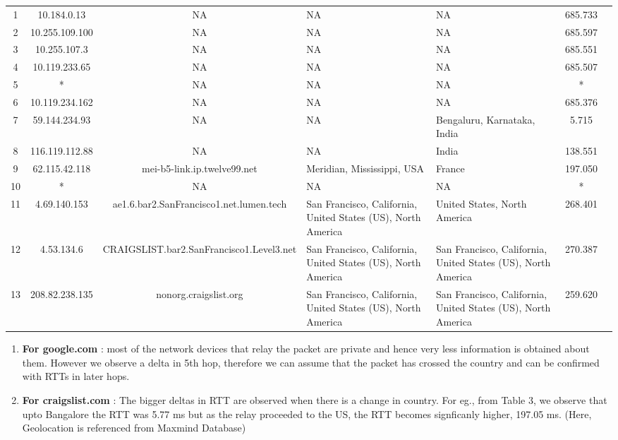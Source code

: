 \documentclass[12pt]{article}
\begin{document}
\begin{enumerate}
\begin{table}[h!]
{\begin{tabular}{|c|c|c| >{\centering\arraybackslash}m{} | >{\centering\arraybackslash}m{} |c|c|}
            \hline
            1 & 10.184.0.13 & NA & NA & NA & 685.733 \\
            2 & 10.255.109.100 & NA & NA & NA & 685.597 \\
            3 & 10.255.107.3 & NA & NA & NA & 685.551 \\
            4 & 10.119.233.65 & NA & NA & NA & 685.507 \\
            5 & * & NA & NA & NA & * \\
            6 & 10.119.234.162 & NA & NA & NA & 685.376 \\
            7 & 59.144.234.93 & NA & NA & Bengaluru, Karnataka, India & 5.715 \\
            8 & 116.119.112.88 & NA & NA & India & 138.551 \\
            9 & 62.115.42.118 & mei-b5-link.ip.twelve99.net & Meridian, Mississippi, USA & France & 197.050 \\
            10 & * & NA & NA & NA & * \\
            11 & 4.69.140.153 & ae1.6.bar2.SanFrancisco1.net.lumen.tech & San Francisco, California, United States (US), North America & United States, North America & 268.401 \\
            12 & 4.53.134.6 & CRAIGSLIST.bar2.SanFrancisco1.Level3.net & San Francisco, California, United States (US), North America & San Francisco, California, United States (US), North America & 270.387 \\
            13 & 208.82.238.135 & nonorg.craigslist.org & San Francisco, California, United States (US), North America & San Francisco, California, United States (US), North America & 259.620 \\
            \hline
        \end{tabular}}
    \end{table}

    \begin{enumerate}
        \item \textbf{For google.com} : most of the network devices that relay the packet are private and hence very less information is obtained about them. However we observe a delta in 5th hop, therefore we can assume that the packet has crossed the country and can be confirmed with RTTs in later hops.
        \item \textbf{For craigslist.com} : The bigger deltas in RTT are observed when there is a change in country. For eg., from Table 3, we observe that upto Bangalore the RTT was 5.77 ms but as the relay proceeded to the US, the RTT becomes signficanly higher, 197.05 ms. (Here, Geolocation is referenced from Maxmind Database)
    \end{enumerate}


\end{enumerate}
\end{document}
